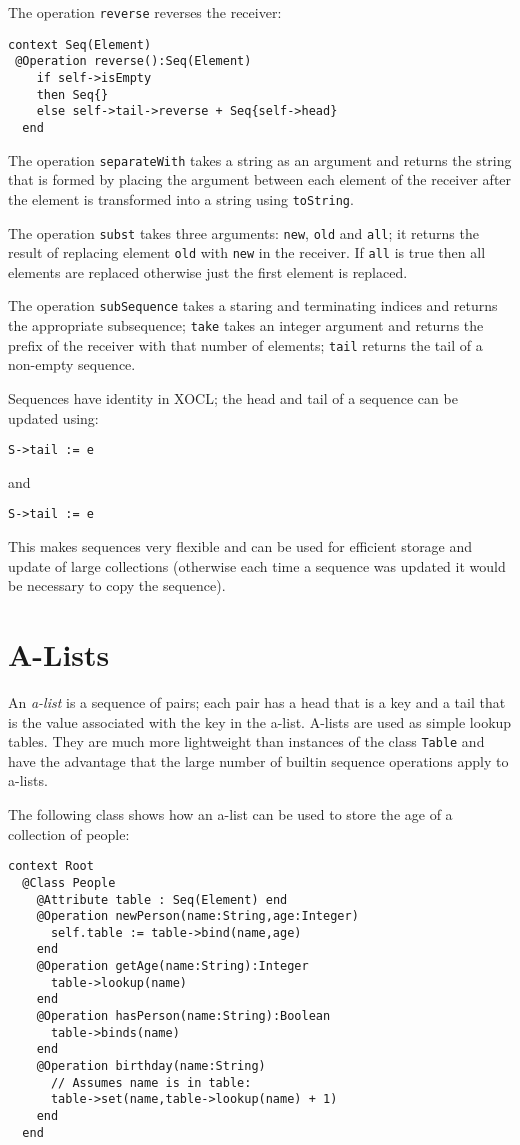 \documentclass{article}
\begin{document}
The operation {\tt reverse} reverses the receiver:
\begin{verbatim}
context Seq(Element)
 @Operation reverse():Seq(Element)
    if self->isEmpty
    then Seq{}
    else self->tail->reverse + Seq{self->head}
  end
\end{verbatim}
The operation {\tt separateWith} takes a string as an argument and returns the string that is formed
by placing the argument between each element of the receiver after the element is transformed into
a string using {\tt toString}.

The operation {\tt subst} takes three arguments: {\tt new}, {\tt old} and {\tt all}; it returns the
result of replacing element {\tt old} with {\tt new} in the receiver. If {\tt all} is true then 
all elements are replaced otherwise just the first element is replaced.

The operation {\tt subSequence} takes a staring and terminating indices and returns the appropriate
subsequence; {\tt take} takes an integer argument and returns the prefix of the receiver with that number
of elements; {\tt tail} returns the tail of a non-empty sequence.

Sequences have identity in XOCL; the head and tail of a sequence can be updated using:
\begin{verbatim}
S->tail := e
\end{verbatim}
and
\begin{verbatim}
S->tail := e
\end{verbatim}
This makes sequences very flexible and can be used for efficient storage and update of large collections
(otherwise each time a sequence was updated it would be necessary to copy the sequence).

\section{A-Lists}

An {\em a-list} is a sequence of pairs; each pair has a head that is a key and a tail that is the value 
associated with the key in the a-list. A-lists are used as simple lookup tables. They are much more 
lightweight than instances of the class {\tt Table} and have the advantage that the large number of
builtin sequence operations apply to a-lists. 

The following class shows how an a-list can be used to store the age of a collection of people:
\begin{verbatim}
context Root
  @Class People
    @Attribute table : Seq(Element) end
    @Operation newPerson(name:String,age:Integer)
      self.table := table->bind(name,age)
    end
    @Operation getAge(name:String):Integer
      table->lookup(name)
    end
    @Operation hasPerson(name:String):Boolean
      table->binds(name)
    end
    @Operation birthday(name:String)
      // Assumes name is in table:
      table->set(name,table->lookup(name) + 1)
    end
  end
\end{verbatim}
\end{document}
